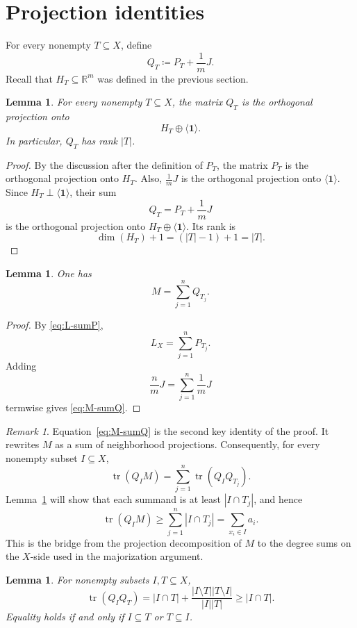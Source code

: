 \documentclass[twoside, reqno]{amsart}
\newtheorem{lemma}[theorem]{Lemma}
\theoremstyle{definition}
\theoremstyle{remark}
\newtheorem{remark}[theorem]{Remark}
\newcommand{\RR}{\mathbb R}
\begin{document}
\section{Projection identities}

For every nonempty $T\subseteq X$, define
\[
Q_T\coloneqq P_T+\frac{1}{m}J.
\]
Recall that $H_T\subseteq\RR^m$ was defined in the previous section.

\begin{lemma}\label{lem:Q-proj}
For every nonempty $T\subseteq X$, the matrix $Q_T$ is the 
orthogonal projection onto
\[
H_T\oplus \langle \mathbf1\rangle.
\]
In particular, $Q_T$ has rank $|T|$.
\end{lemma}

\begin{proof}
By the discussion after the definition of $P_T$, the matrix $P_T$ is the orthogonal projection onto $H_T$. Also, $\frac{1}{m}J$ is the orthogonal projection onto $\langle \mathbf1\rangle$. Since $H_T\perp\langle \mathbf1\rangle$, their sum
\[
Q_T=P_T+\frac{1}{m}J
\]
is the orthogonal projection onto $H_T\oplus\langle\mathbf1\rangle$. Its rank is
\[
\dim(H_T)+1=(|T|-1)+1=|T|.
\]
\end{proof}

\begin{lemma}\label{lem:M-sumQ}
One has
\begin{equation}\label{eq:M-sumQ}
M=\sum_{j=1}^n Q_{T_j}.
\end{equation}
\end{lemma}

\begin{proof}
By \eqref{eq:L-sumP},
\[
L_X=\sum_{j=1}^n P_{T_j}.
\]
Adding
\[
\frac{n}{m}J=\sum_{j=1}^n \frac{1}{m}J
\]
termwise gives \eqref{eq:M-sumQ}.
\end{proof}

\begin{remark}
Equation~\eqref{eq:M-sumQ} is the second key identity of the proof.
It rewrites $M$ as a sum of neighborhood projections. Consequently, for
every nonempty subset $I\subseteq X$,
\[
\operatorname{tr}(Q_I M)=\sum_{j=1}^n \operatorname{tr}(Q_IQ_{T_j}).
\]
Lemma~\ref{lem:overlap} will show that each summand is at least
$|I\cap T_j|$, and hence
\[
\operatorname{tr}(Q_I M)\ge \sum_{j=1}^n |I\cap T_j|
= \sum_{x_i\in I} a_i.
\]
This is the bridge from the projection decomposition of $M$ to the
degree sums on the $X$-side used in the majorization argument.
\end{remark}

\begin{lemma}\label{lem:overlap}
For nonempty subsets $I,T\subseteq X$,
\begin{equation}\label{eq:overlap}
\operatorname{tr}(Q_IQ_T)
=
|I\cap T|+\frac{|I\setminus T||T\setminus I|}{|I||T|}
\ge |I\cap T|.
\end{equation}
Equality holds if and only if $I\subseteq T$ or $T\subseteq I$.
\end{lemma}
\end{document}
